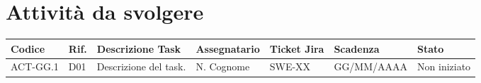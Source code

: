 \newpage

\section{Attività da svolgere}

\renewcommand{\arraystretch}{1.3}
\noindent
{\small\setlength{\tabcolsep}{3pt}%
\begin{tabularx}{\textwidth}{|>{\raggedright\arraybackslash}p{1.75cm}|>{\raggedright\arraybackslash}p{0.75cm}|>{\raggedright\arraybackslash}X|>{\raggedright\arraybackslash}p{2.3cm}|>{\raggedright\arraybackslash}p{1.35cm}|>{\raggedright\arraybackslash}p{1.8cm}|>{\raggedright\arraybackslash}p{1.85cm}|}
    \hline
    \textbf{Codice} & \textbf{Rif.} & \textbf{Descrizione Task} & \textbf{Assegnatario} & \textbf{Ticket Jira} & \textbf{Scadenza} & \textbf{Stato} \\
    \hline
    ACT-GG.1 & D01 & Descrizione del task. & N. Cognome & SWE-XX & GG/MM/AAAA & Non iniziato \\
    \hline
\end{tabularx}}
